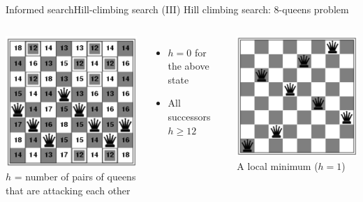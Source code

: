 \documentclass[10pt,compress]{beamer} %
\begin{document}
\begin{frame}{Informed search}{Hill-climbing search (III)}
    \center Hill climbing search: 8-queens problem

    \begin{columns}[t]
        \includegraphics[width=0.7\linewidth]{figs/8queens-hill1.png}\\
        $h$ = number of pairs of queens that are attacking each other
        \begin{itemize}
            \item $h = 0$ for the above state
            \item All successors $h \ge 12$
        \end{itemize}

        \includegraphics[width=0.7\linewidth]{figs/8queens-hill2.png}\\
        A local minimum ($h=1$)
    \end{columns}
\end{frame}
\end{document}
